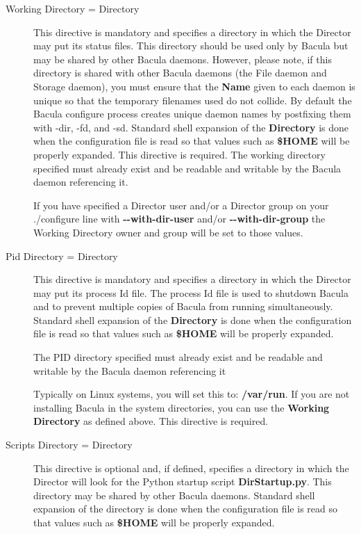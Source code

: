 \begin{description}
\item [Working Directory = \lt{}Directory\gt{}]
   This directive  is mandatory and specifies a directory in which the Director 
   may put its status files. This directory should be used only  by Bacula but
   may be shared by other Bacula daemons. However, please note, if this
   directory is shared with other Bacula daemons (the File daemon and Storage
   daemon), you must ensure that the {\bf Name} given to each daemon is
   unique so that the temporary filenames used do not collide.  By default
   the Bacula configure process creates unique daemon names by postfixing them
   with -dir, -fd, and -sd. Standard shell expansion of the {\bf
   Directory}  is done when the configuration file is read so that values such 
   as {\bf \$HOME} will be properly expanded. This directive is required.
   The working directory specified must already exist and be
   readable and writable by the Bacula daemon referencing it.

   If you have specified a Director user and/or a Director group on your
   ./configure line with {\bf {-}{-}with-dir-user} and/or 
   {\bf {-}{-}with-dir-group} the Working Directory owner and group will
   be set to those values.

\item [Pid Directory = \lt{}Directory\gt{}]
   This directive  is mandatory and specifies a directory in which the Director 
   may put its process Id file. The process Id file is used to  shutdown
   Bacula and to prevent multiple copies of  Bacula from running simultaneously. 
   Standard shell expansion of the {\bf Directory}  is done when the
   configuration file is read so that values such  as {\bf \$HOME} will be
   properly expanded.  

   The PID directory specified must already exist and be
   readable and writable by the Bacula daemon referencing it

   Typically on Linux systems, you will set this to:  {\bf /var/run}. If you are
   not installing Bacula in the  system directories, you can use the {\bf Working
   Directory} as  defined above.  This directive is required.  

\item [Scripts Directory = \lt{}Directory\gt{}]
   This directive is optional and, if defined, specifies a directory in
   which the Director will look for the Python startup script {\bf
   DirStartup.py}.  This directory may be shared by other Bacula daemons.
   Standard shell expansion of the directory is done when the configuration
   file is read so that values such as {\bf \$HOME} will be properly
   expanded.


\end{description}
